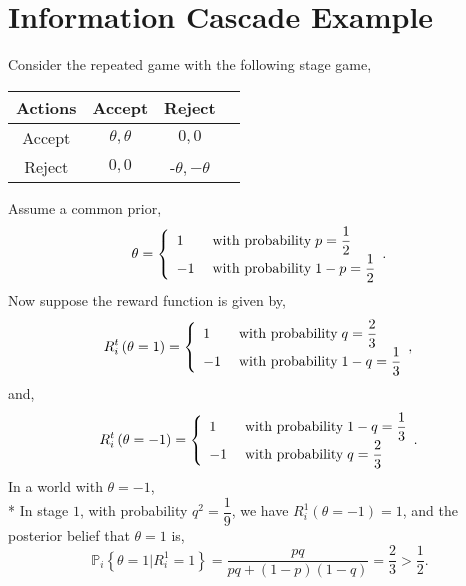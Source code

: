 \documentclass{article}
\begin{document}
\section{Information Cascade Example} 
Consider the repeated game with the following stage game,
\begin{center} \begin{tabular}{|c|c|c|c|}
\hline
 Actions &Accept &Reject\\ \hline
Accept &$\theta, \theta$ &$0, 0$\\ \hline
Reject &$0, 0$ &-$\theta, -\theta$\\ \hline
\end{tabular} \end{center}
Assume a common prior,
\begin{equation} \theta =\left\{ \begin{array}{ll}
1& \text{\;with probability\;} p = \dfrac{1}{2} \\
-1& \text{\;with probability\;} 1 - p = \dfrac{1}{2} \\
\end{array}.\right. \end{equation}
Now suppose the reward function is given by,
\begin{equation} R_{i}^{t}\left(\theta = 1\right) =\left\{ \begin{array}{ll}
1& \text{\;with probability\;} q = \dfrac{2}{3} \\
-1& \text{\;with probability\;} 1 - q = \dfrac{1}{3} \\
\end{array},\right. \end{equation}
and,
\begin{equation} R_{i}^{t}\left(\theta = -1\right) =\left\{ \begin{array}{ll}
1& \text{\;with probability\;} 1 - q = \dfrac{1}{3} \\
-1& \text{\;with probability\;} q = \dfrac{2}{3} \\
\end{array}.\right. \end{equation}
In a world with $\theta = -1$,
\\* In stage $1$, with probability $q^{2} = \dfrac{1}{9}$, we have $R_{i}^{1}\left(\theta = -1\right) = 1$, and the posterior belief that $\theta = 1$ is,
\begin{equation} 
\mathbb{P}_{i} \left\{\theta = 1 | R_{i}^{1} = 1\right\} = \dfrac{p q}{p q + \left(1 - p\right)\left(1 - q\right)} = \dfrac{2}{3} > \dfrac{1}{2} .
\end{equation}
\end{document}
